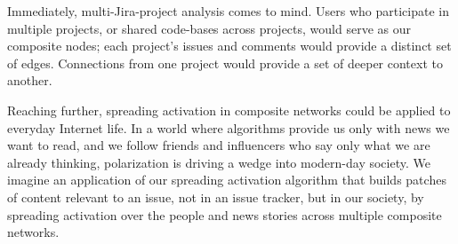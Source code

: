 Immediately, multi-Jira-project analysis comes to mind. Users who participate in multiple projects, or shared code-bases across projects, would serve as our composite nodes; each project's issues and comments would provide a distinct set of edges. Connections from one project would provide a set of deeper context to another.

Reaching further, spreading activation in composite networks could be applied to everyday Internet life. In a world where algorithms provide us only with news we want to read, and we follow friends and influencers who say only what we are already thinking, polarization is driving a wedge into modern-day society. We imagine an application of our spreading activation algorithm that builds patches of content relevant to an issue, not in an issue tracker, but in our society, by spreading activation over the people and news stories across multiple composite networks.
